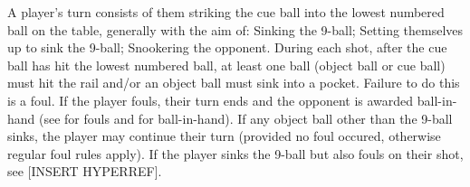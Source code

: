 
 A player's turn consists of them striking the cue ball into the lowest numbered ball on the table, generally with the aim of:%
\subsubruleitem Sinking the 9-ball;%
\subsubruleitem Setting themselves up to sink the 9-ball;%
\subsubruleitem Snookering the opponent.%
 During each shot, after the cue ball has hit the lowest numbered ball, at least one ball (object ball or cue ball) must hit the rail and/or an object ball must sink into a pocket. Failure to do this is a foul.
 \FootOnGround%
 If the player fouls, their turn ends and the opponent is awarded ball-in-hand (see  for fouls and  for ball-in-hand).%
 If any object ball other than the 9-ball sinks, the player may continue their turn (provided no foul occured, otherwise regular foul rules apply).%
 If the player sinks the 9-ball but also fouls on their shot, see [INSERT HYPERREF].%
 {}%
 {}%


